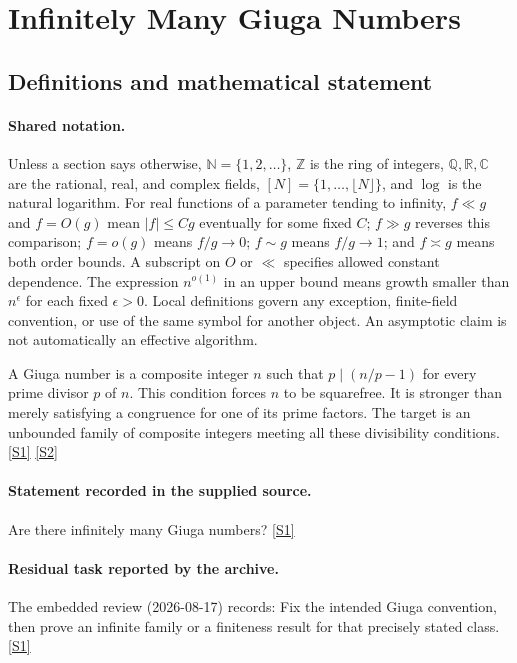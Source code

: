 \documentclass[11pt,a4paper]{article}
\newcommand{\N}{\mathbb{N}}
\newcommand{\Z}{\mathbb{Z}}
\newcommand{\Q}{\mathbb{Q}}
\newcommand{\R}{\mathbb{R}}
\newcommand{\C}{\mathbb{C}}
\newcommand{\sref}[2]{\hyperlink{source:#1:#2}{[S#2]}}
\begin{document}
\section{Infinitely Many Giuga Numbers}\label{statement}


\subsection{Definitions and mathematical statement}

\paragraph{Shared notation.}Unless a section says otherwise, $\N=\{1,2,\ldots\}$,
$\Z$ is the ring of integers, $\Q,\R,\C$ are the rational, real, and complex
fields, $[N]=\{1,\ldots,\lfloor N\rfloor\}$, and $\log$ is the natural
logarithm. For real functions of a parameter tending to infinity,
$f\ll g$ and $f=O(g)$ mean $|f|\leq Cg$ eventually for some fixed $C$;
$f\gg g$ reverses this comparison; $f=o(g)$ means $f/g\to0$;
$f\sim g$ means $f/g\to1$; and $f\asymp g$ means both order bounds.
A subscript on $O$ or $\ll$ specifies allowed constant dependence.
The expression $n^{o(1)}$ in an upper bound means growth smaller than
$n^\epsilon$ for each fixed $\epsilon>0$. Local definitions govern any
exception, finite-field convention, or use of the same symbol for another
object. An asymptotic claim is not automatically an effective algorithm.



A Giuga number is a composite integer $n$ such that $p\mid(n/p-1)$ for every prime divisor $p$ of $n$. This condition forces $n$ to be squarefree. It is stronger than merely satisfying a congruence for one of its prime factors. The target is an unbounded family of composite integers meeting all these divisibility conditions. \sref{statement}{1} \sref{statement}{2}

\paragraph{Statement recorded in the supplied source.}
Are there infinitely many Giuga numbers? \sref{statement}{1}

\paragraph{Residual task reported by the archive.}

The embedded review (2026-08-17) records: Fix the intended Giuga convention, then prove an infinite family or a finiteness result for that precisely stated class. \sref{statement}{1}
\end{document}
